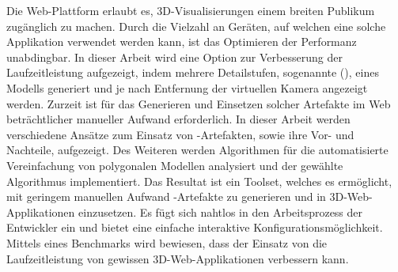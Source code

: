Die Web-Plattform erlaubt es, 3D-Visualisierungen einem breiten Publikum zugänglich zu machen. Durch die Vielzahl an Geräten, auf welchen eine solche Applikation verwendet werden kann, ist das Optimieren der Performanz unabdingbar. In dieser Arbeit wird eine Option zur Verbesserung der Laufzeitleistung aufgezeigt, indem mehrere Detailstufen, sogenannte  (), eines Modells generiert und je nach Entfernung der virtuellen Kamera angezeigt werden. Zurzeit ist für das Generieren und Einsetzen solcher Artefakte im Web beträchtlicher manueller Aufwand erforderlich.
\bigbreak
In dieser Arbeit werden verschiedene Ansätze zum Einsatz von -Artefakten, sowie ihre Vor- und Nachteile, aufgezeigt.
Des Weiteren werden Algorithmen für die automatisierte Vereinfachung von polygonalen Modellen analysiert und der gewählte Algorithmus implementiert.
\bigbreak
Das Resultat ist ein Toolset, welches es ermöglicht, mit geringem manuellen Aufwand -Artefakte zu generieren und in 3D-Web-Applikationen einzusetzen.
Es fügt sich nahtlos in den Arbeitsprozess der Entwickler ein und bietet eine einfache interaktive Konfigurationsmöglichkeit.
Mittels eines Benchmarks wird bewiesen, dass der Einsatz von  die Laufzeitleistung von gewissen 3D-Web-Applikationen verbessern kann.
